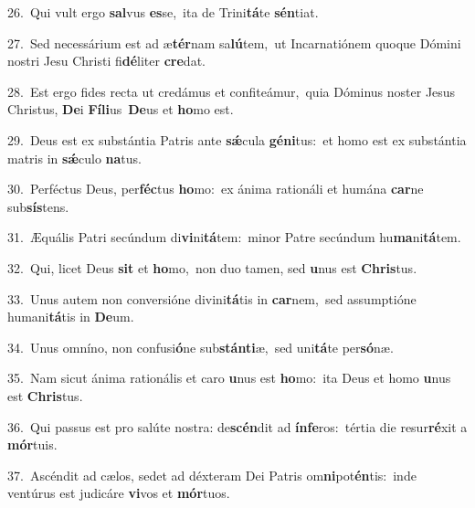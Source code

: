 {\numbfont\textcolor{\numbcolor}{26.}}~Qui vult ergo \textbf{sal}\-vus \textbf{es}\-se,~\star ita de Trini\-\textbf{tá}\-te \textbf{sén}\-tiat.\par
{\numbfont\textcolor{\numbcolor}{27.}}~Sed necessárium est ad æ\-\textbf{tér}\-nam sa\-\textbf{lú}\-tem,~\star ut Incarnatiónem quoque Dómini nostri Jesu Christi fi\-\textbf{dé}\-liter \textbf{cre}\-dat.\par
{\numbfont\textcolor{\numbcolor}{28.}}~Est ergo fides recta ut credámus et confiteámur,~\dagger quia Dóminus noster Jesus Christus, \textbf{De}\-i \textbf{Fí}\-\textbf{li}us~\star \textbf{De}\-us et \textbf{ho}\-mo est.\par
{\numbfont\textcolor{\numbcolor}{29.}}~Deus est ex substántia Patris ante \textbf{sǽ}\-cula \textbf{gé}\-\textbf{ni}tus:~\star et homo est ex substántia matris in \textbf{sǽ}\-culo \textbf{na}\-tus.\par
{\numbfont\textcolor{\numbcolor}{30.}}~Perféctus Deus, per\-\textbf{féc}\-tus \textbf{ho}\-mo:~\star ex ánima rationáli et humána \textbf{car}\-ne sub\-\textbf{sís}\-tens.\par
{\numbfont\textcolor{\numbcolor}{31.}}~Æquális Patri secúndum di\-\textbf{vi}\-ni\-\textbf{tá}\-tem:~\star minor Patre secúndum hu\-\textbf{ma}\-ni\-\textbf{tá}\-tem.\par
{\numbfont\textcolor{\numbcolor}{32.}}~Qui, licet Deus \textbf{sit} et \textbf{ho}\-mo,~\star non duo tamen, sed \textbf{u}\-nus est \textbf{Chris}\-tus.\par
{\numbfont\textcolor{\numbcolor}{33.}}~Unus autem non conversióne divini\-\textbf{tá}\-tis in \textbf{car}\-nem,~\star sed assumptióne humani\-\textbf{tá}\-tis in \textbf{De}\-um.\par
{\numbfont\textcolor{\numbcolor}{34.}}~Unus omníno, non confusi\-\textbf{ó}\-ne sub\-\textbf{stán}\-\textbf{ti}æ,~\star sed uni\-\textbf{tá}\-te per\-\textbf{só}\-næ.\par
{\numbfont\textcolor{\numbcolor}{35.}}~Nam sicut ánima rationális et caro \textbf{u}\-nus est \textbf{ho}\-mo:~\star ita Deus et homo \textbf{u}\-nus est \textbf{Chris}\-tus.\par
{\numbfont\textcolor{\numbcolor}{36.}}~Qui passus est pro salúte nostra: de\-\textbf{scén}\-dit ad \textbf{ín}\-\textbf{fe}ros:~\star tértia die resur\-\textbf{ré}\-xit a \textbf{mór}\-tuis.\par
{\numbfont\textcolor{\numbcolor}{37.}}~Ascéndit ad cælos, sedet ad déxteram Dei Patris om\-\textbf{ni}\-pot\-\textbf{én}\-tis:~\star inde ventúrus est judicáre \textbf{vi}\-vos et \textbf{mór}\-tuos.\par
